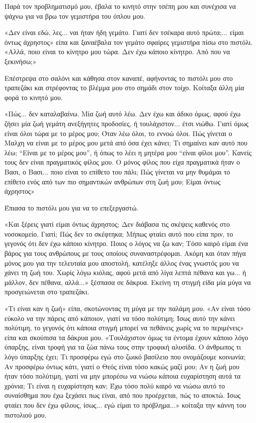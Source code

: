 \documentclass[12pt,twoside, openany]{book}
\begin{document}
Παρά τον προβληματισμό μου, έβαλα το κινητό στην τσέπη μου και συνέχισα να ψάχνω για να βρω τον γεμιστήρα του όπλου μου.

«Δεν είναι εδώ, λες... ναι ήταν ήδη γεμάτο. Γιατί δεν τσέκαρα αυτό πρώτα;... είμαι όντως άχρηστος» είπα και ξαναέβαλα τον γεμάτο σφαίρες γεμιστήρα πίσω στο πιστόλι. «Αλλά, ποιο είναι το κίνητρο μου τώρα. Δεν έχω κάποιο κίνητρο. Από που να ξεκινήσω;»

Επέστρεψα στο σαλόνι και κάθησα στον καναπέ, αφήνοντας το πιστόλι μου στο τραπεζάκι και στρέφοντας το βλέμμα μου στο σημάδι στον τοίχο. Κοίταξα άλλη μία φορά το κινητό μου.

«Πώς... δεν καταλαβαίνω. Μία ζωή αυτό λέω. Δεν έχω και άδικο όμως, αφού έχω ζήσει μία ζωή γεμάτη ανεξήγητες προδοσίες, ή τουλάχιστον... έτσι νιώθω. Γιατί όμως είναι όλοι τώρα με το μέρος μου; Όταν λέω όλοι, το εννοώ όλοι. Πώς γίνεται ο Μαλχη να είναι με το μέρος μου μετά από όσα έχει κάνει; Τι σημαίνει καν αυτό που λέω; “Είναι με το μέρος μου”, ή όπως το λέει η μητέρα μου “είναι φίλοι μου”. Κανείς τους δεν είναι πραγματικός φίλος μου. Ο μόνος φίλος που είχα πραγματικά ήταν ο Βασι, ο Βασι... ποιο είναι το επίθετο του πάλι; Πώς γίνεται να μην θυμάμαι το επίθετο ενός από των πιο σημαντικών ανθρώπων στη ζωή μου; Είμαι όντως άχρηστος»

Έπιασα το πιστόλι μου για να το επεξεργαστώ.

«Και ξέρεις γιατί είμαι όντως άχρηστος; Δεν διάβασα τις σκέψεις καθενός στο νοσοκομείο. Γιατί; Πώς δεν το σκέφτηκα; Μήπως φταίει αυτό που είπα πριν, το γεγονός ότι δεν έχω κάποιο κίνητρο. Ποιος ο λόγος να ζω καν; Τόσο καιρό είμαι ένα βάρος για τους ανθρώπους με τους οποίους συναναστρέφομαι. Ακόμη και όταν πήγα μόνος μου για την τελευταία μου αποστολή, κατέληξε άλλος ένας γνωστός μου να χάνει τη ζωή του. Χωρίς λόγω κιόλας, αφού μετά από λίγα λεπτά πέθανα και γω... ή μάλλον, δεν πέθανα, αλλά...» ξέσπασα σε δάκρυα. Εκείνη τη στιγμή είδα μία μύγα να προσγειώνεται στο τραπεζάκι.

«Τι είναι καν η ζωή» είπα, σκοτώνοντας τη μύγα με την παλάμη μου. «Αν είναι τόσο εύκολο να την πάρεις από κάποιον, γιατί να τόσο πολύτιμη; Ίσως αυτό την κάνει πολύτιμη, το γεγονός ότι κάποια στιγμή μπορεί να πεθάνεις χωρίς να το περιμένεις» είπα και σκούπισα τα δάκρυα μου. «Τουλάχιστον όμως τα έντομα έχουν κάποιο λόγο ύπαρξης, είναι τροφή για τα ζώα πάνω τους στην τροφική αλυσίδα. Ο άνθρωπος τι λόγο ύπαρξης έχει; Τι προσφέρω εγώ στο ζωικό βασίλειο που ονομάζουμε κοινωνία; Αν προσφέρω όντως κάτι, γιατί ο Θεός είναι τόσο κακώς μαζί μου; Αν η ζωή μου ήταν τόσο πολύτιμη, γιατί να μην μπορέσω να νιώσω κάποια ευχαρίστηση αυτά τα χρόνια; Τι είναι η ευχαρίστηση καν; Έχω τόσο πολύ καιρό να νιώσω αυτό το συναίσθημα που έχω ξεχάσει πως είναι, από που προέρχεται, πώς το αποκτώ. Ίσως φταίει που δεν έχω φίλους, ίσως... εγώ είμαι το πρόβλημα...» κοίταξα την κάννη του πιστολιού μου.
\end{document}
